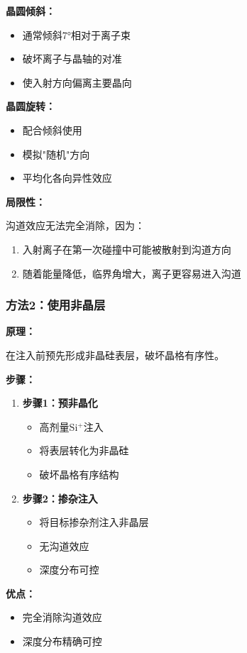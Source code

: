 \documentclass[UTF8,12pt,a4paper]{ctexart}
\begin{document}
\textbf{晶圆倾斜：}
\begin{itemize}
    \item 通常倾斜7°相对于离子束
    \item 破坏离子与晶轴的对准
    \item 使入射方向偏离主要晶向
\end{itemize}

\textbf{晶圆旋转：}
\begin{itemize}
    \item 配合倾斜使用
    \item 模拟"随机"方向
    \item 平均化各向异性效应
\end{itemize}

\textbf{局限性：}

沟道效应无法完全消除，因为：
\begin{enumerate}
    \item 入射离子在第一次碰撞中可能被散射到沟道方向
    \item 随着能量降低，临界角增大，离子更容易进入沟道
\end{enumerate}

\subsubsection{方法2：使用非晶层}

\textbf{原理：}

在注入前预先形成非晶硅表层，破坏晶格有序性。

\textbf{步骤：}
\begin{enumerate}
    \item \textbf{步骤1：预非晶化}
    \begin{itemize}
        \item 高剂量Si$^+$注入
        \item 将表层转化为非晶硅
        \item 破坏晶格有序结构
    \end{itemize}
    
    \item \textbf{步骤2：掺杂注入}
    \begin{itemize}
        \item 将目标掺杂剂注入非晶层
        \item 无沟道效应
        \item 深度分布可控
    \end{itemize}
\end{enumerate}

\textbf{优点：}
\begin{itemize}
    \item 完全消除沟道效应
    \item 深度分布精确可控
\end{itemize}
\end{document}
